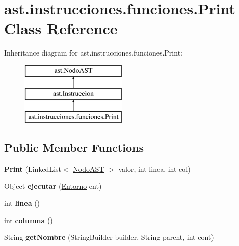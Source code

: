 \hypertarget{classast_1_1instrucciones_1_1funciones_1_1_print}{}\section{ast.\+instrucciones.\+funciones.\+Print Class Reference}
\label{classast_1_1instrucciones_1_1funciones_1_1_print}
Inheritance diagram for ast.\+instrucciones.\+funciones.\+Print\+:\begin{figure}[H]
\begin{center}
\leavevmode
\includegraphics[height=3.000000cm]{classast_1_1instrucciones_1_1funciones_1_1_print}
\end{center}
\end{figure}
\subsection*{Public Member Functions}
\begin{DoxyCompactItemize}
\item 
\mbox{\label{classast_1_1instrucciones_1_1funciones_1_1_print_add8316f296f8a793e597906f2874f7b0}} 
{\bfseries Print} (Linked\+List$<$ \mbox{\hyperlink{interfaceast_1_1_nodo_a_s_t}{Nodo\+A\+ST}} $>$ valor, int linea, int col)
\item 
\mbox{\label{classast_1_1instrucciones_1_1funciones_1_1_print_aefe6b8b06145ac5e7ac367b839f2d861}} 
Object {\bfseries ejecutar} (\mbox{\hyperlink{classentorno_1_1_entorno}{Entorno}} ent)
\item 
\mbox{\label{classast_1_1instrucciones_1_1funciones_1_1_print_a20f188614be38d425b4b42f35676673d}} 
int {\bfseries linea} ()
\item 
\mbox{\label{classast_1_1instrucciones_1_1funciones_1_1_print_a279e5c30d78d45262a9b46545c4da963}} 
int {\bfseries columna} ()
\item 
\mbox{\label{classast_1_1instrucciones_1_1funciones_1_1_print_a72e2d43be5f9cc22424a183e4f75b465}} 
String {\bfseries get\+Nombre} (String\+Builder builder, String parent, int cont)
\end{DoxyCompactItemize}


